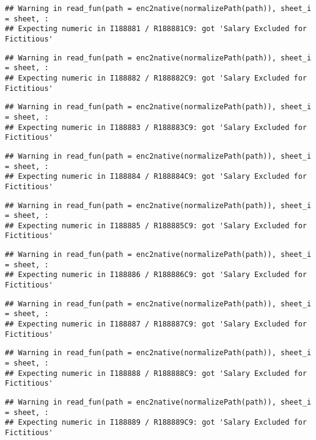 \documentclass[
]{article}
\begin{document}
\begin{verbatim}
## Warning in read_fun(path = enc2native(normalizePath(path)), sheet_i = sheet, :
## Expecting numeric in I188881 / R188881C9: got 'Salary Excluded for Fictitious'
\end{verbatim}

\begin{verbatim}
## Warning in read_fun(path = enc2native(normalizePath(path)), sheet_i = sheet, :
## Expecting numeric in I188882 / R188882C9: got 'Salary Excluded for Fictitious'
\end{verbatim}

\begin{verbatim}
## Warning in read_fun(path = enc2native(normalizePath(path)), sheet_i = sheet, :
## Expecting numeric in I188883 / R188883C9: got 'Salary Excluded for Fictitious'
\end{verbatim}

\begin{verbatim}
## Warning in read_fun(path = enc2native(normalizePath(path)), sheet_i = sheet, :
## Expecting numeric in I188884 / R188884C9: got 'Salary Excluded for Fictitious'
\end{verbatim}

\begin{verbatim}
## Warning in read_fun(path = enc2native(normalizePath(path)), sheet_i = sheet, :
## Expecting numeric in I188885 / R188885C9: got 'Salary Excluded for Fictitious'
\end{verbatim}

\begin{verbatim}
## Warning in read_fun(path = enc2native(normalizePath(path)), sheet_i = sheet, :
## Expecting numeric in I188886 / R188886C9: got 'Salary Excluded for Fictitious'
\end{verbatim}

\begin{verbatim}
## Warning in read_fun(path = enc2native(normalizePath(path)), sheet_i = sheet, :
## Expecting numeric in I188887 / R188887C9: got 'Salary Excluded for Fictitious'
\end{verbatim}

\begin{verbatim}
## Warning in read_fun(path = enc2native(normalizePath(path)), sheet_i = sheet, :
## Expecting numeric in I188888 / R188888C9: got 'Salary Excluded for Fictitious'
\end{verbatim}

\begin{verbatim}
## Warning in read_fun(path = enc2native(normalizePath(path)), sheet_i = sheet, :
## Expecting numeric in I188889 / R188889C9: got 'Salary Excluded for Fictitious'
\end{verbatim}
\end{document}

